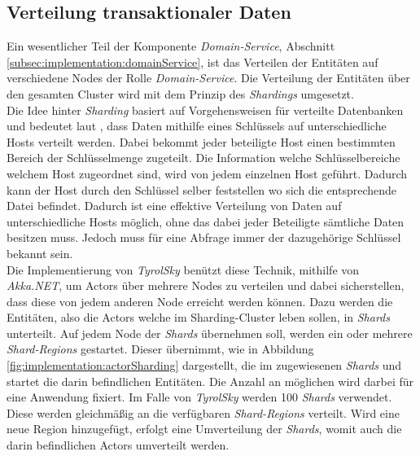 \subsection{Verteilung transaktionaler Daten}
\label{subsec:implementation:akkaSharding}
Ein wesentlicher Teil der Komponente \textit{Domain-Service}, Abschnitt \ref{subsec:implementation:domainService}, ist das Verteilen der Entitäten auf verschiedene Nodes der Rolle \textit{Domain-Service}. Die Verteilung der Entitäten über den gesamten Cluster wird mit dem Prinzip des \textit{Shardings} umgesetzt. \\
Die Idee hinter \textit{Sharding} basiert auf Vorgehensweisen für verteilte Datenbanken und bedeutet laut \cite{shardingCattell}, dass Daten mithilfe eines Schlüssels auf unterschiedliche Hosts verteilt werden. Dabei bekommt jeder beteiligte Host einen bestimmten Bereich der Schlüsselmenge zugeteilt.
Die Information welche Schlüsselbereiche welchem Host zugeordnet sind, wird von jedem einzelnen Host geführt. Dadurch kann der Host durch den Schlüssel selber feststellen wo sich die entsprechende Datei befindet.
Dadurch ist eine effektive Verteilung von Daten auf unterschiedliche Hosts möglich, ohne das dabei jeder Beteiligte sämtliche Daten besitzen muss. Jedoch muss für eine Abfrage immer der dazugehörige Schlüssel bekannt sein. \\
Die Implementierung von \textit{TyrolSky} benützt diese Technik, mithilfe von \textit{Akka.NET}, um Actors über mehrere Nodes zu verteilen und dabei sicherstellen, dass diese von jedem anderen Node erreicht werden können. Dazu werden die Entitäten, also die Actors welche im Sharding-Cluster leben sollen, in \textit{Shards} unterteilt. Auf jedem Node der \textit{Shards} übernehmen soll, werden ein oder mehrere \textit{Shard-Regions} gestartet. Dieser übernimmt, wie in Abbildung \ref{fig:implementation:actorSharding} dargestellt, die im zugewiesenen \textit{Shards} und startet die darin befindlichen Entitäten. Die Anzahl an möglichen  wird darbei für eine Anwendung fixiert. Im Falle von \textit{TyrolSky} werden {100} \textit{Shards} verwendet. Diese werden gleichmäßig an die verfügbaren \textit{Shard-Regions} verteilt. Wird eine neue Region hinzugefügt, erfolgt eine Umverteilung der \textit{Shards}, womit auch die darin befindlichen Actors umverteilt werden. 

